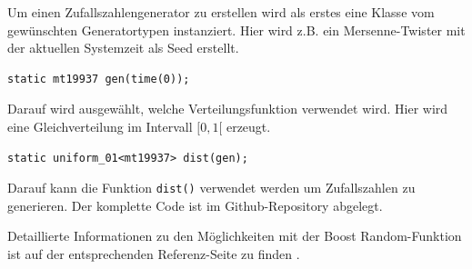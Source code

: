 \documentclass{book}
\begin{document}
\begin{refsection}
Um einen Zufallszahlengenerator zu erstellen wird als erstes eine Klasse vom gewünschten Generatortypen instanziert. Hier wird z.B. ein Mersenne-Twister mit der aktuellen Systemzeit als Seed erstellt.

\begin{lstlisting}[style=C]
static mt19937 gen(time(0));
\end{lstlisting}

Darauf wird ausgewählt, welche Verteilungsfunktion verwendet wird. Hier wird eine Gleichverteilung im Intervall $[0,1[$ erzeugt. 

\begin{lstlisting}[style=C]
static uniform_01<mt19937> dist(gen); 
\end{lstlisting}

Darauf kann die Funktion \texttt{dist()} verwendet werden um Zufallszahlen zu generieren. Der komplette Code ist im Github-Repository \cite{rng:githubRepo} abgelegt.

Detaillierte Informationen zu den Möglichkeiten mit der Boost Random-Funktion ist auf der entsprechenden Referenz-Seite zu finden \cite{rng:boostRandom}.



\newpage
\printbibliography[heading=subbibliography]
\end{refsection}
\end{document}
